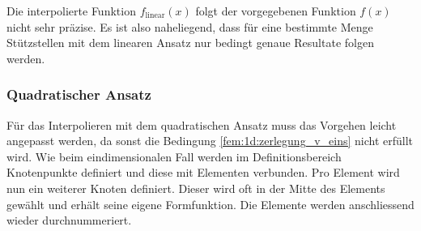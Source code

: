 Die interpolierte Funktion $f_\text{linear} (x)$ folgt der vorgegebenen Funktion $f(x)$ nicht sehr präzise.
Es ist also naheliegend, dass für eine bestimmte Menge Stützstellen mit dem linearen Ansatz nur bedingt genaue Resultate folgen werden.

\subsubsection{Quadratischer Ansatz}
 
Für das Interpolieren mit dem quadratischen Ansatz muss das Vorgehen leicht angepasst werden, da sonst die Bedingung \ref{fem:1d:zerlegung_v_eins} nicht erfüllt wird. 
Wie beim eindimensionalen Fall werden im Definitionsbereich Knotenpunkte definiert und diese mit Elementen verbunden.
Pro Element wird nun ein weiterer Knoten definiert. 
Dieser wird oft in der Mitte des Elements gewählt und erhält seine eigene Formfunktion.
Die Elemente werden anschliessend wieder durchnummeriert.

